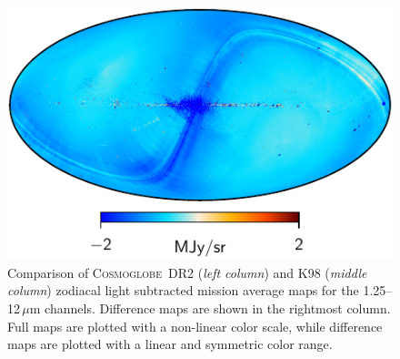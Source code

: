 \documentclass{aa}
\def\Cosmoglobe{\textsc{Cosmoglobe}}
\begin{document}
\begin{figure}
        \includegraphics[width=0.33\linewidth]{figs/diff_CG_DIRBE_ZSMA_05_n256.pdf}
	\caption{Comparison of \Cosmoglobe\ DR2 (\emph{left column}) and K98 (\emph{middle column}) zodiacal light subtracted mission average maps for the 1.25--12$\,\mu$m channels. Difference maps are shown in the rightmost column. Full maps are plotted with a non-linear color scale, while difference maps are plotted with a linear and symmetric color range.}
	\label{fig:freqmaps_cg_vs_dirbe1}
\end{figure}
\end{document}
